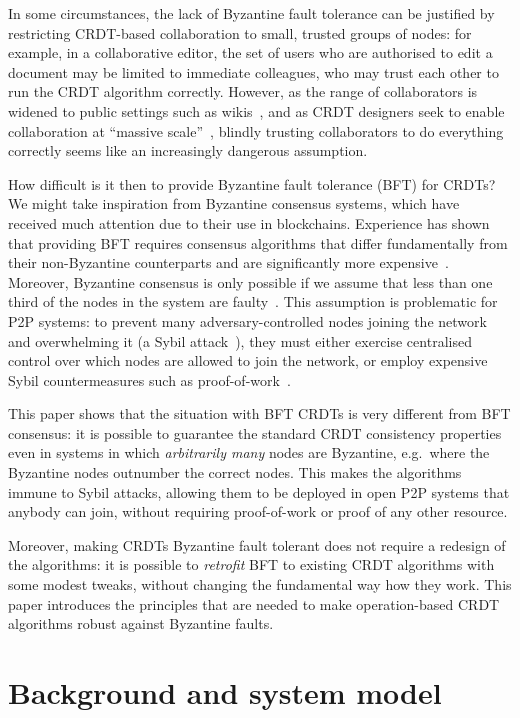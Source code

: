 \documentclass[sigplan,review]{acmart}
\begin{document}
In some circumstances, the lack of Byzantine fault tolerance can be justified by restricting CRDT-based collaboration to small, trusted groups of nodes: for example, in a collaborative editor, the set of users who are authorised to edit a document may be limited to immediate colleagues, who may trust each other to run the CRDT algorithm correctly.
However, as the range of collaborators is widened to public settings such as wikis~\cite{Nedelec:2016eo,Weiss:2007,Weiss:2009ht}, and as CRDT designers seek to enable collaboration at ``massive scale''~\cite{Andre:2013,Weiss:2009ht,Lv:2016}, blindly trusting collaborators to do everything correctly seems like an increasingly dangerous assumption.

How difficult is it then to provide Byzantine fault tolerance (BFT) for CRDTs?
We might take inspiration from Byzantine consensus systems, which have received much attention due to their use in blockchains.
Experience has shown that providing BFT requires consensus algorithms that differ fundamentally from their non-Byzantine counterparts and are significantly more expensive~\cite{Bano:2019}.
Moreover, Byzantine consensus is only possible if we assume that less than one third of the nodes in the system are faulty~\cite{Dwork:1988}.
This assumption is problematic for P2P systems: to prevent many adversary-controlled nodes joining the network and overwhelming it (a Sybil attack~\cite{Douceur:2002}), they must either exercise centralised control over which nodes are allowed to join the network, or employ expensive Sybil countermeasures such as proof-of-work~\cite{Nakamoto:2008}.

This paper shows that the situation with BFT CRDTs is very different from BFT consensus: it is possible to guarantee the standard CRDT consistency properties even in systems in which \emph{arbitrarily many} nodes are Byzantine, e.g.\ where the Byzantine nodes outnumber the correct nodes.
This makes the algorithms immune to Sybil attacks, allowing them to be deployed in open P2P systems that anybody can join, without requiring proof-of-work or proof of any other resource.

Moreover, making CRDTs Byzantine fault tolerant does not require a redesign of the algorithms: it is possible to \emph{retrofit} BFT to existing CRDT algorithms with some modest tweaks, without changing the fundamental way how they work.
This paper introduces the principles that are needed to make operation-based CRDT algorithms robust against Byzantine faults.


\section{Background and system model}\label{sec:background}
\end{document}
